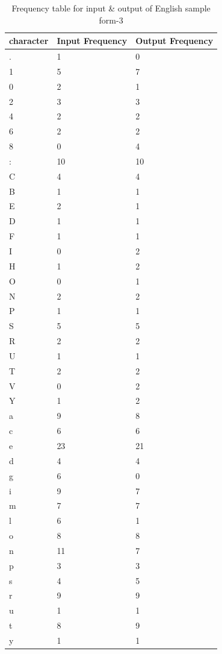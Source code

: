 \begin{table}[H]
\centering
\begin{tabular}{|p{2cm}|p{2cm}|p{2cm}|}
\hline
character & Input Frequency & Output Frequency \\
\hline
. & 1 & 0\\
\hline
1 & 5 & 7\\
\hline
0 & 2 & 1\\
\hline
2 & 3 & 3\\
\hline
4 & 2 & 2\\
\hline
6 & 2 & 2\\
\hline
8 & 0 & 4\\
\hline
: & 10 & 10\\
\hline
C & 4 & 4\\
\hline
B & 1 & 1\\
\hline
E & 2 & 1\\
\hline
D & 1 & 1\\
\hline
F & 1 & 1\\
\hline
I & 0 & 2\\
\hline
H & 1 & 2\\
\hline
O & 0 & 1\\
\hline
N & 2 & 2\\
\hline
P & 1 & 1\\
\hline
S & 5 & 5\\
\hline
R & 2 & 2\\
\hline
U & 1 & 1\\
\hline
T & 2 & 2\\
\hline
V & 0 & 2\\
\hline
Y & 1 & 2\\
\hline
a & 9 & 8\\
\hline
c & 6 & 6\\
\hline
e & 23 & 21\\
\hline
d & 4 & 4\\
\hline
g & 6 & 0\\
\hline
i & 9 & 7\\
\hline
m & 7 & 7\\
\hline
l & 6 & 1\\
\hline
o & 8 & 8\\
\hline
n & 11 & 7\\
\hline
p & 3 & 3\\
\hline
s & 4 & 5\\
\hline
r & 9 & 9\\
\hline
u & 1 & 1\\
\hline
t & 8 & 9\\
\hline
y & 1 & 1\\
\hline
\end{tabular}
\caption {Frequency table for input \& output of English sample form-3}
\label {tab:Table3}
\end{table}

